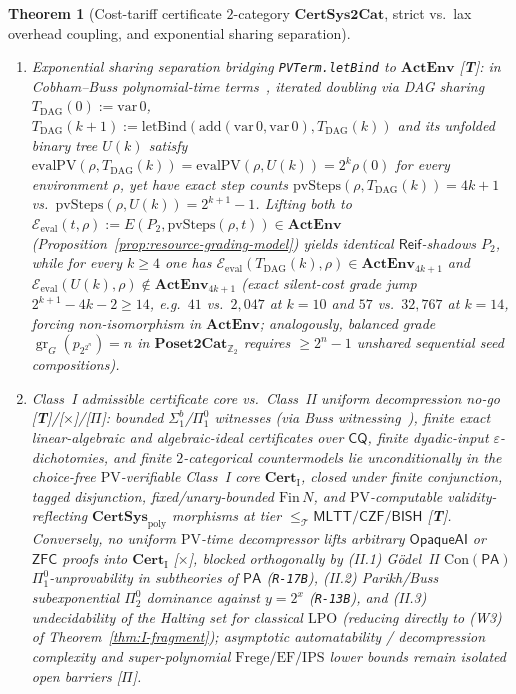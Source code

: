 \documentclass[11pt]{article}
\theoremstyle{plain}
\newtheorem{theorem}{Theorem}[section]
\theoremstyle{definition}
\newcommand{\gr}{\operatorname{gr}}
\newcommand{\Con}{\mathrm{Con}}
\newcommand{\PA}{\mathsf{PA}}
\newcommand{\ZFC}{\mathsf{ZFC}}
\begin{document}
\begin{theorem}[Cost-tariff certificate $2$-category $\mathbf{CertSys2Cat}$, strict vs.\ lax overhead coupling, and exponential sharing separation]
\begin{enumerate}[nosep,label=(\roman*)]
\item \emph{Exponential sharing separation bridging \texttt{PVTerm.letBind} to $\mathbf{ActEnv}$ \textup{[\textbf{T}]}}: in Cobham--Buss polynomial-time terms~\cite{Buss1986}, iterated doubling via DAG sharing $T_{\mathrm{DAG}}(0) := \mathrm{var}\,0$, $T_{\mathrm{DAG}}(k+1) := \mathrm{letBind}(\mathrm{add}(\mathrm{var}\,0, \mathrm{var}\,0), T_{\mathrm{DAG}}(k))$ and its unfolded binary tree $U(k)$ satisfy $\mathrm{evalPV}(\rho, T_{\mathrm{DAG}}(k)) = \mathrm{evalPV}(\rho, U(k)) = 2^k \rho(0)$ for every environment $\rho$, yet have exact step counts $\mathrm{pvSteps}(\rho, T_{\mathrm{DAG}}(k)) = 4k + 1$ vs.\ $\mathrm{pvSteps}(\rho, U(k)) = 2^{k+1} - 1$. Lifting both to $\mathcal{E}_{\mathrm{eval}}(t, \rho) := E(P_2, \mathrm{pvSteps}(\rho, t)) \in \mathbf{ActEnv}$ (Proposition~\ref{prop:resource-grading-model}) yields identical $\mathsf{Reif}$-shadows $P_2$, while for every $k \ge 4$ one has $\mathcal{E}_{\mathrm{eval}}(T_{\mathrm{DAG}}(k), \rho) \in \mathbf{ActEnv}_{4k+1}$ and $\mathcal{E}_{\mathrm{eval}}(U(k), \rho) \notin \mathbf{ActEnv}_{4k+1}$ (exact silent-cost grade jump $2^{k+1} - 4k - 2 \ge 14$, e.g.\ $41$ vs.\ $2{,}047$ at $k=10$ and $57$ vs.\ $32{,}767$ at $k=14$, forcing non-isomorphism in $\mathbf{ActEnv}$; analogously, balanced grade $\gr_G(p_{2^{2^n}}) = n$ in $\mathbf{Poset2Cat}_{\mathbb{Z}_2}$ requires $\ge 2^n - 1$ unshared sequential seed compositions).
\item \emph{Class~I admissible certificate core vs.\ Class~II uniform decompression no-go \textup{[\textbf{T}]}/\textup{[\textbf{$\times$}]}/\textup{[\textbf{$\Pi$}]}}: bounded $\Sigma^b_1$/$\Pi^0_1$ witnesses (via Buss witnessing~\cite{Buss1986}), finite exact linear-algebraic and algebraic-ideal certificates over $\mathsf{CQ}$, finite dyadic-input $\varepsilon$-dichotomies, and finite $2$-categorical countermodels lie unconditionally in the choice-free $\mathrm{PV}$-verifiable Class~I core $\mathbf{Cert}_{\mathrm{I}}$, closed under finite conjunction, tagged disjunction, fixed/unary-bounded $\mathrm{Fin}\,N$, and $\mathrm{PV}$-computable validity-reflecting $\mathbf{CertSys}_{\mathrm{poly}}$ morphisms at tier $\le_{\mathcal{T}} \mathsf{MLTT/CZF/BISH}$ \textup{[\textbf{T}]}. Conversely, \emph{no} uniform $\mathrm{PV}$-time decompressor lifts arbitrary $\mathsf{OpaqueAI}$ or $\ZFC$ proofs into $\mathbf{Cert}_{\mathrm{I}}$ \textup{[\textbf{$\times$}]}, blocked orthogonally by (II.1) G\"odel~II $\Con(\PA)$ $\Pi^0_1$-unprovability in subtheories of $\PA$ (\texttt{R-17B}), (II.2) Parikh/Buss subexponential $\Pi^0_2$ dominance against $y = 2^x$ (\texttt{R-13B}), and (II.3) undecidability of the Halting set for classical $\mathrm{LPO}$ (reducing directly to \textup{(W3)} of Theorem~\ref{thm:I-fragment}); asymptotic automatability / decompression complexity and super-polynomial $\mathrm{Frege}/\mathrm{EF}/\mathrm{IPS}$ lower bounds remain isolated open barriers \textup{[\textbf{$\Pi$}]}.
\end{enumerate}
\end{theorem}
\end{document}
